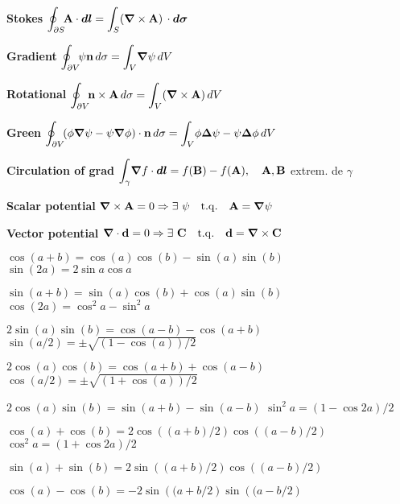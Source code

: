 \item \textbf{Stokes} \quad
$\displaystyle{\oint_{\partial S}} \! \vec{\rm{A}} \cdot \vec{dl} = \displaystyle{\int_S} (\vec{\nabla} \times \vec{\rm{A}}) \, \cdot \vec{d\sigma}$
 
\item \textbf{Gradient} \quad
$\displaystyle{\oint_{\partial V}} \! \psi\vec{\rm{n}} \, d\sigma = \displaystyle{\int_V} \vec{\nabla}\psi \, dV$
 
\item \textbf{Rotational} \quad
$\displaystyle{\oint_{\partial V}} \! \vec{\rm{n}} \times \vec{\rm{A}} \, d\sigma = \displaystyle{\int_V} (\vec{\nabla} \times \vec{\rm{A}}) \, dV$
 
\item \textbf{Green} \quad
$\displaystyle{\oint_{\partial V}} \! (\phi\vec{\nabla}\psi - \psi\vec{\nabla}\phi)\cdot\vec{\rm{n}} \, d\sigma = \displaystyle{\int_V} \phi\vec{\Delta}\psi - \psi\vec{\Delta}\phi \, dV$
 
\item \textbf{Circulation of grad} \quad
$\displaystyle{\int_{\gamma}} \vec{\nabla}f\cdot\vec{dl} = f(\vec{\rm B}) - f(\vec{\rm A}), \quad \vec{\rm{A}}, \vec{\rm{B}}$ extrem. de $\gamma$ 
 
\item \textbf{Scalar potential} \quad
$\vec{\nabla} \times \vec{\rm{A}} = 0 \Rightarrow \exists \ \psi \quad \mathrm{t.q.} \quad \vec{\rm{A}} = \vec{\nabla}\psi$
 
\item \textbf{Vector potential} \quad
$\vec{\nabla}\cdot\vec{\rm{d} } = 0 \Rightarrow \exists \ \vec{\rm{C}} \quad \mathrm{t.q.} \quad \vec{\rm{d} } = \vec{\nabla} \times \vec{\rm C}$
\squishend 

\squishlist 
\item $\cos(a+b) = \cos(a)\cos(b)-\sin(a)\sin(b)$ \squishsep $\sin(2a) = 2\sin a \cos a$
\item $\sin(a+b) = \sin(a)\cos(b) + \cos(a)\sin(b)$ \squishsep $\cos(2a) = \cos^2 a - \sin^2 a$
\item $2\sin(a)\sin(b) = \cos(a-b) - \cos(a+b)$ \smallsquishsep $\sin(a/2) = \pm \sqrt{(1-\cos(a))/2}$
\item $2\cos(a)\cos(b) = \cos(a+b) + \cos(a-b)$ \smallsquishsep $\cos(a/2) = \pm \sqrt{(1+\cos(a))/2}$
\item $2\cos(a)\sin(b) = \sin(a+b) - \sin(a-b)$ \smallsquishsep $\sin^2a = (1-\cos 2a)/2$
\item $\cos(a) + \cos(b) = 2\cos\left((a+b)/2\right)\cos\left((a-b)/2\right)$ \;\squishitem \; $\cos^2 a = (1+\cos 2a) / 2$
\item $\sin(a) + \sin(b) = 2\sin\left((a+b)/2\right)\cos\left((a-b)/2\right)$ 
\item $\cos(a) - \cos(b) = -2\sin\left((a+b/2\right)\sin\left((a-b/2\right)$ 

